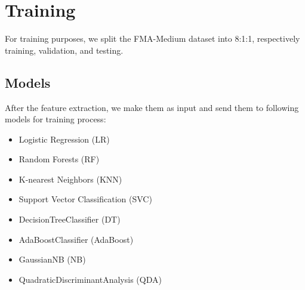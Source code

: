 \section{Training}

For training purposes, we split the FMA-Medium dataset into 8:1:1, respectively training, validation, and testing.

\subsection{Models}
After the feature extraction, we make them as input and send them to following models for training process:
\begin{itemize}
    \item Logistic Regression (LR)
    \item Random Forests (RF)
    \item K-nearest Neighbors (KNN)
    \item Support Vector Classification (SVC)
    \item DecisionTreeClassifier (DT)
    \item AdaBoostClassifier (AdaBoost)
    \item GaussianNB (NB)
    \item QuadraticDiscriminantAnalysis (QDA)
\end{itemize}
